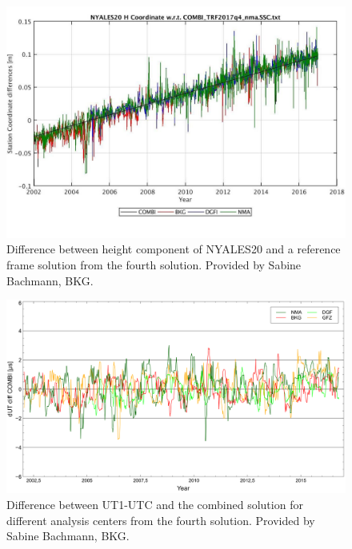 \documentclass[twocolumn,twoside]{svmultivs_gm} %
\begin{document}
\begin{figure}[!htbp]
\includegraphics[width=\linewidth]{kirkvik03}
\caption{Difference between height component of NYALES20 and a reference frame solution from the fourth solution.
Provided by Sabine Bachmann, BKG.}
\label{fig:nyal_h}
\end{figure}

\begin{figure}[!htbp]
\includegraphics[width=\linewidth]{kirkvik04}
\caption{Difference between UT1-UTC and the combined solution for different analysis centers from the fourth solution.
Provided by Sabine Bachmann, BKG.}
\label{fig:dut}
\end{figure}
\end{document}
